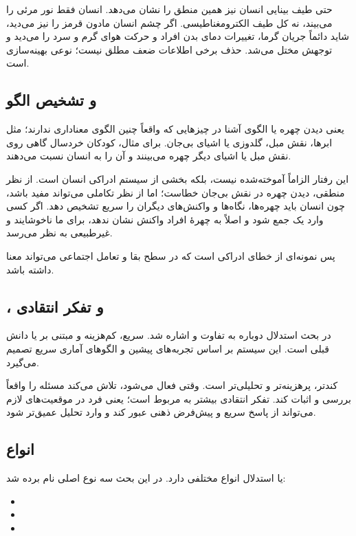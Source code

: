 حتی طیف بینایی انسان نیز همین منطق را نشان می‌دهد. انسان فقط نور مرئی را می‌بیند، نه کل طیف الکترومغناطیسی. اگر چشم انسان مادون قرمز را نیز می‌دید، شاید دائماً جریان گرما، تغییرات دمای بدن افراد و حرکت هوای گرم و سرد را می‌دید و توجهش مختل می‌شد. حذف برخی اطلاعات ضعف مطلق نیست؛ نوعی بهینه‌سازی است.

\subsection{ و تشخیص الگو}
 یعنی دیدن چهره یا الگوی آشنا در چیزهایی که واقعاً چنین الگوی معناداری ندارند؛ مثل ابرها، نقش مبل، گلدوزی یا اشیای بی‌جان. برای مثال، کودکان خردسال گاهی روی نقش مبل یا اشیای دیگر چهره می‌بینند و آن را به انسان نسبت می‌دهند.

این رفتار الزاماً آموخته‌شده نیست، بلکه بخشی از سیستم ادراکی انسان است. از نظر منطقی، دیدن چهره در نقش بی‌جان خطاست؛ اما از نظر تکاملی می‌تواند مفید باشد، چون انسان باید چهره‌ها، نگاه‌ها و واکنش‌های دیگران را سریع تشخیص دهد. اگر کسی وارد یک جمع شود و اصلاً به چهرهٔ افراد واکنش نشان ندهد، برای ما ناخوشایند و غیرطبیعی به نظر می‌رسد.

پس  نمونه‌ای از خطای ادراکی است که در سطح بقا و تعامل اجتماعی می‌تواند معنا داشته باشد.

\subsection{،  و تفکر انتقادی}
در بحث استدلال دوباره به تفاوت  و  اشاره شد.  سریع، کم‌هزینه و مبتنی بر  یا دانش قبلی است. این سیستم بر اساس تجربه‌های پیشین و الگوهای آماری سریع تصمیم می‌گیرد.

 کندتر، پرهزینه‌تر و تحلیلی‌تر است. وقتی فعال می‌شود، تلاش می‌کند مسئله را واقعاً بررسی و اثبات کند. تفکر انتقادی بیشتر به  مربوط است؛ یعنی فرد در موقعیت‌های لازم می‌تواند از پاسخ سریع و پیش‌فرض ذهنی عبور کند و وارد تحلیل عمیق‌تر شود.

\subsection{انواع }
 یا استدلال انواع مختلفی دارد. در این بحث سه نوع اصلی نام برده شد:

\begin{itemize}
  \item {}
  \item {}
  \item {}
\end{itemize}

